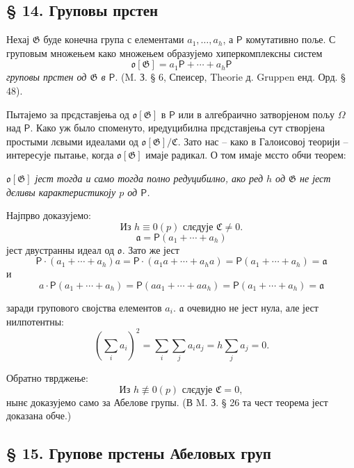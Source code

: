 \documentclass[11pt]{article}
\begin{document}
\subsection*{§ 14. Груповы прстен}\label{der-gruppenring}

Нехај \(\mathfrak G\) буде конечна група с елементами \(a_1,\ldots,a_h\), а \(\mathsf P\) комутативно поље. С груповым множењем како множењем образујемо хиперкомплексны систем
\[
\mathfrak o[\mathfrak G]=a_1\mathsf P+\cdots+a_h\mathsf P
\]
\emph{груповы прстен од \(\mathfrak G\) в \(\mathsf P\)}. (M. З. § 6, Спеисер, Theorie д. Gruppen енд. Орд. § 48).

Пытајемо за прєдставјења од \(\mathfrak o[\mathfrak G]\) в \(\mathsf P\) или в алгебраично затворјеном пољу \(\Omega\) над \(\mathsf P\). Како уж было споменуто, иредуцибилна прєдставјења сут створјена простыми лєвыми идеалами од \(\mathfrak o[\mathfrak G]/\mathfrak C\). Зато нас -- како в Галоисовој теорији -- интересује пытање, когда \(\mathfrak o[\mathfrak G]\) имаје радикал. О том имаје мєсто обчи теорем:

\begin{center}
\emph{\(\mathfrak o[\mathfrak G]\) јест тогда и само тогда полно редуцибилно, ако ред \(h\) од \(\mathfrak G\) не јест дєливы карактеристикоју \(p\) од \(\mathsf P\).}
\end{center}

Најпрво доказујемо:
\[
\text{Из } h\equiv0(p) \text{ слєдује } \mathfrak C\ne 0.
\]
\[
\mathfrak a=\mathsf P(a_1+\cdots+a_h)
\]
јест двустранны идеал од \(\mathfrak o\). Зато же јест
\[
\mathsf P\cdot(a_1+\cdots+a_h)a
=\mathsf P\cdot(a_1a+\cdots+a_ha)
=\mathsf P(a_1+\cdots+a_h)=\mathfrak a
\]
и
\[
a\cdot\mathsf P(a_1+\cdots+a_h)
=\mathsf P(aa_1+\cdots+aa_h)
=\mathsf P(a_1+\cdots+a_h)=\mathfrak a
\]

заради групового својства елементов \(a_i\). \(\mathfrak a\) очевидно не јест нула, але јест нилпотентны:
\[
\left(\sum_i a_i\right)^2=\sum_i\sum_j a_i a_j
=h\sum_j a_j=0.
\]

Обратно тврджење:
\[
\text{Из } h\not\equiv0(p) \text{ слєдује } \mathfrak C=0,
\]
нынє доказујемо само за Абелове групы. (В M. З. § 26 та чест теорема јест доказана обче.)

\subsection*{§ 15. Групове прстены Абеловых груп}\label{die-gruppenringe-abelscher-gruppen}
\end{document}
